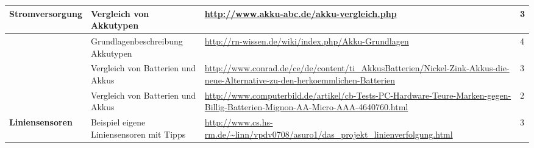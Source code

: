 \begin{tabular}{|p{3cm}|p{3.5cm}|p{5cm}|p{2cm}|}
\textbf{Stromversorgung}	&	Vergleich von Akkutypen	&	\url{http://www.akku-abc.de/akku-vergleich.php}	&	3 \\\hline
				 			&	Grundlagenbeschreibung Akkutypen 	&	\url{http://rn-wissen.de/wiki/index.php/Akku-Grundlagen}	&	4 \\\hline
				 			&	Vergleich von Batterien und Akkus	&	\url{http://www.conrad.de/ce/de/content/ti_AkkusBatterien/Nickel-Zink-Akkus-die-neue-Alternative-zu-den-herkoemmlichen-Batterien}	&	3 \\\hline
				 			&	Vergleich von Batterien und Akkus	&	\url{http://www.computerbild.de/artikel/cb-Tests-PC-Hardware-Teure-Marken-gegen-Billig-Batterien-Mignon-AA-Micro-AAA-4640760.html } & 2	\\\hline
				 			
				 			
\textbf{Liniensensoren}	&	Beispiel eigene Liniensensoren mit Tipps	&	\url{http://www.cs.hs-rm.de/~linn/vpdv0708/asuro1/das_projekt_linienverfolgung.html}	&	3 \\\hline
\end{tabular}
\newpage
